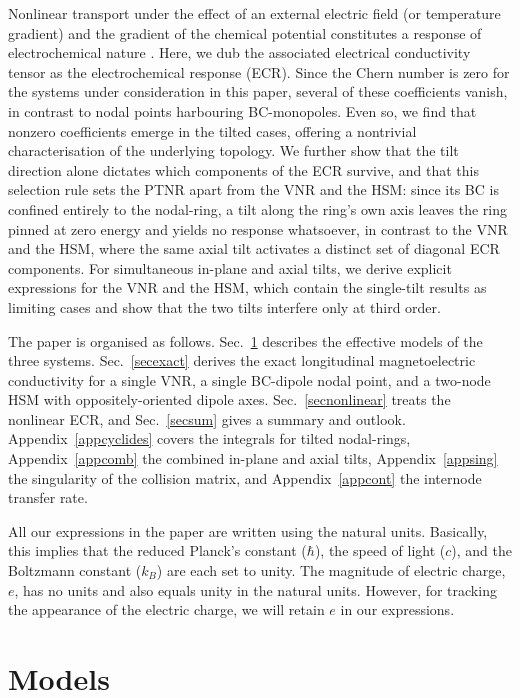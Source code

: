 \documentclass[aps,prb,onecolumn,nofootinbib,citeautoscript,10pt]{revtex4-2}
\begin{document}
Nonlinear transport under the effect of an external electric field (or temperature gradient) and the gradient of the chemical potential constitutes a response of electrochemical nature \cite{ips-shreya}. Here, we dub the associated electrical conductivity tensor as the electrochemical response (ECR). Since the Chern number is zero for the systems under consideration in this paper, several of these coefficients vanish, in contrast to nodal points harbouring BC-monopoles. Even so, we find that nonzero coefficients emerge in the tilted cases, offering a nontrivial characterisation of the underlying topology. We further show that the tilt direction alone dictates which components of the ECR survive, and that this selection rule sets the PTNR apart from the VNR and the HSM: since its BC is confined entirely to the nodal-ring, a tilt along the ring's own axis leaves the ring pinned at zero energy and yields no response whatsoever, in contrast to the VNR and the HSM, where the same axial tilt activates a distinct set of diagonal ECR components. For simultaneous in-plane and axial tilts, we derive explicit expressions for the VNR and the HSM, which contain the single-tilt results as limiting cases and show that the two tilts interfere only at third order.


The paper is organised as follows. Sec.~\ref{secmodels} describes the effective models of the three systems. Sec.~\ref{secexact} derives the exact longitudinal magnetoelectric conductivity for a single VNR, a single BC-dipole nodal point, and a two-node HSM with oppositely-oriented dipole axes. Sec.~\ref{secnonlinear} treats the nonlinear ECR, and Sec.~\ref{secsum} gives a summary and outlook. Appendix~\ref{appcyclides} covers the integrals for tilted nodal-rings, Appendix~\ref{appcomb} the combined in-plane and axial tilts, Appendix~\ref{appsing} the singularity of the collision matrix, and Appendix~\ref{appcont} the internode transfer rate.


All our expressions in the paper are written using the natural units. Basically, this implies that the reduced Planck's constant ($\hbar $), the speed of light ($c$), and the Boltzmann constant ($k_B $) are each set to unity. The magnitude of electric charge, $e$, has no units and also equals unity in the natural units. However, for tracking the appearance of the electric charge, we will retain $e$ in our expressions. 

\section{Models}
\label{secmodels}
\end{document}

